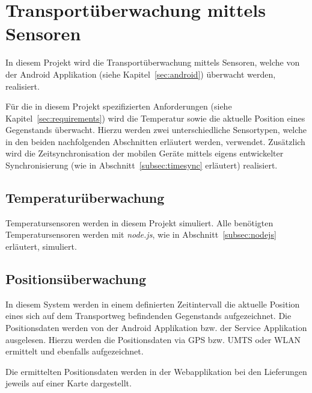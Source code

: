 \section{Transportüberwachung mittels Sensoren}\label{sensors}
\label{sec:sensors}

In diesem Projekt wird die Transportüberwachung mittels Sensoren, welche
	von der Android Applikation (siehe Kapitel~\ref{sec:android}) überwacht
	werden, realisiert.
	
Für die in diesem Projekt spezifizierten Anforderungen (siehe
	Kapitel~\ref{sec:requirements})
	wird die Temperatur sowie die aktuelle Position eines Gegenstands überwacht. Hierzu
	werden zwei unterschiedliche Sensortypen, welche in den beiden nachfolgenden Abschnitten
	erläutert werden, verwendet. Zusätzlich wird die Zeitsynchronisation der mobilen Geräte
	mittels eigens entwickelter Synchronisierung (wie in Abschnitt~\ref{subsec:timesync}
	erläutert) realisiert.

\subsection{Temperaturüberwachung}

Temperatursensoren werden in diesem Projekt simuliert. Alle benötigten
	Temperatursensoren werden mit \emph{node.js}, wie in
	Abschnitt~\ref{subsec:nodejs} erläutert, simuliert.

\subsection{Positionsüberwachung}

In diesem System werden in einem definierten Zeitintervall die aktuelle
	Position eines sich auf dem Transportweg befindenden Gegenstands aufgezeichnet.
	Die Positionsdaten werden von der Android Applikation bzw. der Service
	Applikation ausgelesen. Hierzu werden die Positionsdaten via GPS bzw. UMTS
	oder WLAN ermittelt und ebenfalls aufgezeichnet.
	
Die ermittelten Positionsdaten werden in der Webapplikation bei den Lieferungen
	jeweils auf einer Karte dargestellt.